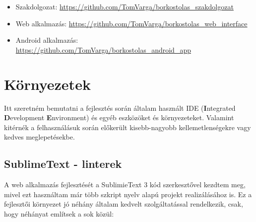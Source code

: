 \documentclass[12pt]{report}
\theoremstyle{definition}
\begin{document}
	\begin{itemize}
		\item Szakdolgozat: \newline
		\url{https://github.com/TomVarga/borkostolas_szakdolgozat}
		\item Web alkalmazás: \newline \url{https://github.com/TomVarga/borkostolas_web_interface}
		\item Android alkalmazás: \newline \url{https://github.com/TomVarga/borkostolas_android_app}
	\end{itemize}
	
	
	\section{Környezetek}
	Itt szeretném bemutatni a fejlesztés során általam használt IDE (\textbf{I}ntegrated \textbf{D}evelopment \textbf{E}nvironment) és egyéb eszközöket és környezeteket. Valamint kitérnék a felhasználásuk során előkerült kisebb-nagyobb kellemetlenségekre vagy kedves meglepetésekbe.
	
	\subsection{SublimeText - linterek}
	A web alkalmazás fejlesztését a SublimieText 3 \cite{SublimeText} kód szerkesztővel kezdtem meg, mivel ezt használtam már több szkript nyelv alapú projekt realizálásához is. Ez a fejlesztői környezet jó néhány általam kedvelt szolgáltatással rendelkezik, csak, hogy néhányat említsek a sok közül:
	
\end{document}
